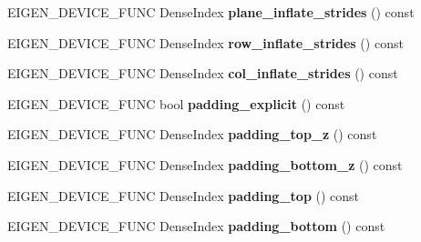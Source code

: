 \begin{DoxyCompactItemize}
\mbox{\label{class_eigen_1_1_tensor_volume_patch_op_a35a464b0b9c41b02233235ed6c83ff3f}} 
E\+I\+G\+E\+N\+\_\+\+D\+E\+V\+I\+C\+E\+\_\+\+F\+U\+NC Dense\+Index {\bfseries plane\+\_\+inflate\+\_\+strides} () const
\item 
\mbox{\label{class_eigen_1_1_tensor_volume_patch_op_a7ec8a659e3a9df305a5e883cb99eb4cd}} 
E\+I\+G\+E\+N\+\_\+\+D\+E\+V\+I\+C\+E\+\_\+\+F\+U\+NC Dense\+Index {\bfseries row\+\_\+inflate\+\_\+strides} () const
\item 
\mbox{\label{class_eigen_1_1_tensor_volume_patch_op_ae4689d47bf6784443f60f14ddff059a4}} 
E\+I\+G\+E\+N\+\_\+\+D\+E\+V\+I\+C\+E\+\_\+\+F\+U\+NC Dense\+Index {\bfseries col\+\_\+inflate\+\_\+strides} () const
\item 
\mbox{\label{class_eigen_1_1_tensor_volume_patch_op_a82cd679f27fe48e3f69749ff05f9a6cb}} 
E\+I\+G\+E\+N\+\_\+\+D\+E\+V\+I\+C\+E\+\_\+\+F\+U\+NC bool {\bfseries padding\+\_\+explicit} () const
\item 
\mbox{\label{class_eigen_1_1_tensor_volume_patch_op_a98223a5b0475c83295beda5113f08f82}} 
E\+I\+G\+E\+N\+\_\+\+D\+E\+V\+I\+C\+E\+\_\+\+F\+U\+NC Dense\+Index {\bfseries padding\+\_\+top\+\_\+z} () const
\item 
\mbox{\label{class_eigen_1_1_tensor_volume_patch_op_af69e5958efe2d9d3610aee5dc2cd978c}} 
E\+I\+G\+E\+N\+\_\+\+D\+E\+V\+I\+C\+E\+\_\+\+F\+U\+NC Dense\+Index {\bfseries padding\+\_\+bottom\+\_\+z} () const
\item 
\mbox{\label{class_eigen_1_1_tensor_volume_patch_op_a2ab323da058e39ab44b3df4839a20e9e}} 
E\+I\+G\+E\+N\+\_\+\+D\+E\+V\+I\+C\+E\+\_\+\+F\+U\+NC Dense\+Index {\bfseries padding\+\_\+top} () const
\item 
\mbox{\label{class_eigen_1_1_tensor_volume_patch_op_aacfbeea312c868ff6da371751e0ec110}} 
E\+I\+G\+E\+N\+\_\+\+D\+E\+V\+I\+C\+E\+\_\+\+F\+U\+NC Dense\+Index {\bfseries padding\+\_\+bottom} () const

\end{DoxyCompactItemize}
